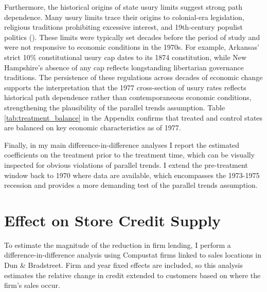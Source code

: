 \documentclass[12pt,english]{article}
\begin{document}
Furthermore, the historical origins of state usury limits suggest strong path dependence. Many usury limits trace their origins to colonial-era legislation, religious traditions prohibiting excessive interest, and 19th-century populist politics (\cite{glaeser_neither_1998}). These limits were typically set decades before the period of study and were not responsive to economic conditions in the 1970s. For example, Arkansas' strict 10\% constitutional usury cap dates to its 1874 constitution, while New Hampshire's absence of any cap reflects longstanding libertarian governance traditions. The persistence of these regulations across decades of economic change supports the interpretation that the 1977 cross-section of usury rates reflects historical path dependence rather than contemporaneous economic conditions, strengthening the plausibility of the parallel trends assumption. Table \ref{tab:treatment_balance} in the Appendix confirms that treated and control states are balanced on key economic characteristics as of 1977.

Finally, in my main difference-in-difference analyses I report the estimated coefficients on the treatment prior to the treatment time, which can be visually inspected for obvious violations of parallel trends. I extend the pre-treatment window back to 1970 where data are available, which encompasses the 1973-1975 recession and provides a more demanding test of the parallel trends assumption.

\section{Effect on Store Credit Supply}\label{sec:substitution}

To estimate the magnitude of the reduction in firm lending, I perform a difference-in-difference analysis using Compustat firms linked to sales locations in Dun \& Bradstreet. Firm and year fixed effects are included, so this analysis estimates the relative change in credit extended to customers based on where the firm's sales occur. 
\end{document}
